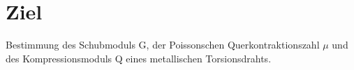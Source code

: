 \section{Ziel}
\label{sec:ziel}

Bestimmung des Schubmoduls G, der Poissonschen Querkontraktionszahl \(\mu\) und des Kompressionsmoduls Q eines metallischen Torsionsdrahts.